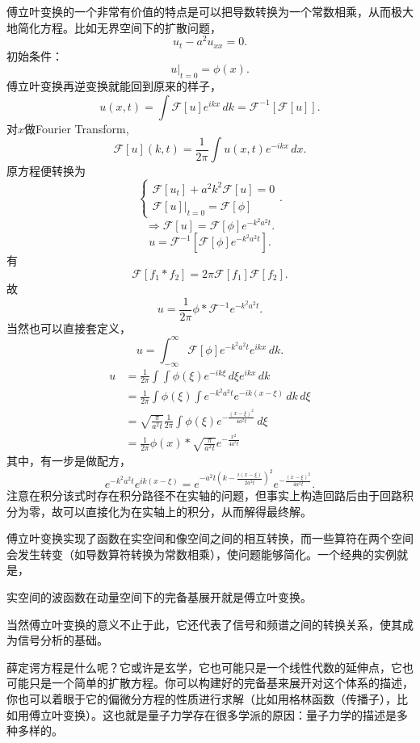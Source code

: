 \documentclass[12pt,a4paper,openany,twoside]{book}
\numberwithin{equation}{section}
\begin{document}
傅立叶变换的一个非常有价值的特点是可以把导数转换为一个常数相乘，从而极大地简化方程。比如无界空间下的扩散问题，
\[
  u_t-a^2u_{xx} = 0
.\] 
初始条件：
\[
  u\big|_{t=0} = \phi(x)
.\] 
傅立叶变换再逆变换就能回到原来的样子，
\[
  u(x,t) = \int \mathcal{F}[u] e^{ikx} \, dk = \mathcal{F}^{-1}[\mathcal{F}[u]]
.\] 
对$x$做Fourier Transform,
\[
  \mathcal{F}[u](k,t) = \frac{1}{2\pi} \int u(x,t) e^{-ikx} \, dx 
.\] 
原方程便转换为
\[
\begin{cases}
  \mathcal{F}[u_t] + a^2 k^2 \mathcal{F}[u] = 0 \\
  \mathcal{F}[u]\big|_{t=0} = \mathcal{F}[\phi]
\end{cases}
.\] 
\[
  \Rightarrow \mathcal{F}[u] = \mathcal{F}[\phi] e^{-k^2 a^2 t}
.\] 
\[
  u = \mathcal{F}^{-1} [\mathcal{F}[\phi] e^{-k^2a^2 t}]
.\] 
有
\[
  \mathcal{F}[f_1 * f_2] = 2\pi \mathcal{F}[f_1] \mathcal{F} [f_2]
.\] 
故
\[
  u = \frac{1}{2\pi} \phi * \mathcal{F}^{-1} e^{-k^2 a^2 t} 
.\] 
当然也可以直接套定义，
\[
  u = \int_{-\infty} ^\infty \mathcal{F}[\phi] e^{-k^2 a^2 t} e^{ikx} \, dk 
.\] 
\begin{align*}
  u &= \frac{1}{2\pi}\int \int \phi(\xi) e^{-ik\xi} \, d\xi e^{ikx}  \, dk\\
    &=\frac{1}{2\pi} \int \phi(\xi) \int e^{-k^2 a^2 t} e^{-ik(x-\xi)} \, dk  \, d\xi \\
    &=\sqrt{\frac{\pi}{a^2 t}}\frac{1}{2\pi} \int \phi(\xi) e^{-\frac{(x-\xi)^2}{4a^2 t}} \, d\xi\\
    &=\frac{1}{2\pi} \phi(x) * \sqrt{\frac{\pi}{a^2 t}} e^{-\frac{x^2}{4 a^2 t}}
\end{align*}
其中，有一步是做配方，
\[
  e^{-k^2a^2 t} e^{ik (x-\xi)} = e^{-a^2 t (k-\frac{i (x-\xi)}{2a^2 t})^2} e^{-\frac{(x-\xi)^2}{4a^2 t}}
.\] 
注意在积分该式时存在积分路径不在实轴的问题，但事实上构造回路后由于回路积分为零，故可以直接化为在实轴上的积分，从而解得最终解。

傅立叶变换实现了函数在实空间和像空间之间的相互转换，而一些算符在两个空间会发生转变（如导数算符转换为常数相乘），使问题能够简化。一个经典的实例就是，
\begin{center}
实空间的波函数在动量空间下的完备基展开就是傅立叶变换。
\end{center}
当然傅立叶变换的意义不止于此，它还代表了信号和频谱之间的转换关系，使其成为信号分析的基础。

薛定谔方程是什么呢？它或许是玄学，它也可能只是一个线性代数的延伸点，它也可能只是一个简单的扩散方程。你可以构建好的完备基来展开对这个体系的描述，你也可以着眼于它的偏微分方程的性质进行求解（比如用格林函数（传播子），比如用傅立叶变换）。这也就是量子力学存在很多学派的原因：量子力学的描述是多种多样的。
\end{document}
